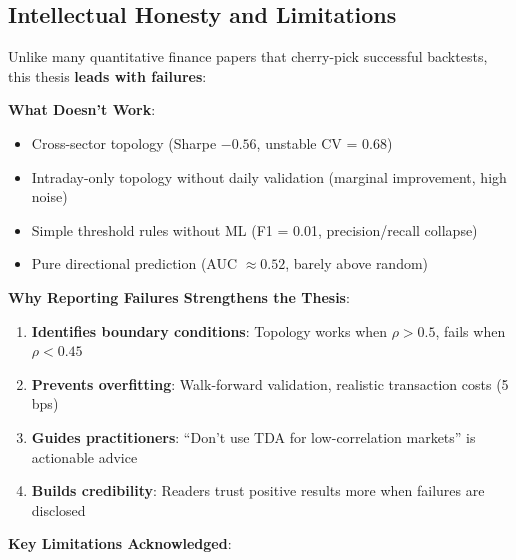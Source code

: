 \subsection{Intellectual Honesty and Limitations}

Unlike many quantitative finance papers that cherry-pick successful backtests, this thesis \textbf{leads with failures}:

\textbf{What Doesn't Work}:
\begin{itemize}
\item Cross-sector topology (Sharpe $-0.56$, unstable CV = 0.68)
\item Intraday-only topology without daily validation (marginal improvement, high noise)
\item Simple threshold rules without ML (F1 = 0.01, precision/recall collapse)
\item Pure directional prediction (AUC $\approx 0.52$, barely above random)
\end{itemize}

\textbf{Why Reporting Failures Strengthens the Thesis}:
\begin{enumerate}
\item \textbf{Identifies boundary conditions}: Topology works when $\rho > 0.5$, fails when $\rho < 0.45$
\item \textbf{Prevents overfitting}: Walk-forward validation, realistic transaction costs (5 bps)
\item \textbf{Guides practitioners}: ``Don't use TDA for low-correlation markets'' is actionable advice
\item \textbf{Builds credibility}: Readers trust positive results more when failures are disclosed
\end{enumerate}

\textbf{Key Limitations Acknowledged}:

